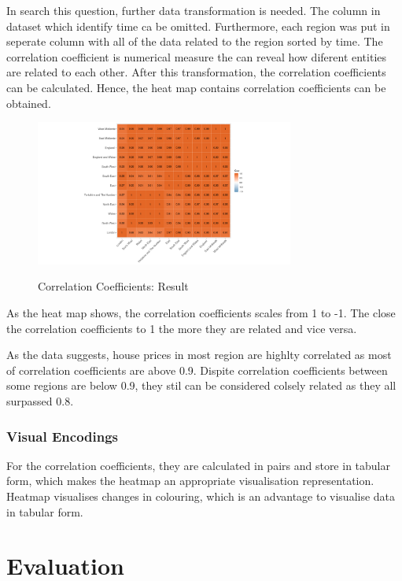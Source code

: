 \documentclass{article}
\begin{document}
In search this question, further data transformation is needed. The column in dataset which identify time 
ca be omitted. Furthermore, each region was put in seperate column with all of the data related to the region 
sorted by time. The correlation coefficient is numerical measure the can reveal how diferent entities are 
related to each other. After this transformation, the correlation coefficients can be calculated. Hence, 
the heat map contains correlation coefficients can be obtained.

\begin{figure}[H]
  \begin{minipage}[b]{1.0\linewidth}
    \centering
    \centerline{\includegraphics[width=8.5cm]{corHeatMap}}
    \centerline{Correlation Coefficients: Result}\medskip
  \end{minipage}
\end{figure}

As the heat map shows, the correlation coefficients scales from 1 to -1. The close the correlation coefficients 
to 1 the more they are related and vice versa.

As the data suggests, house prices in most region are highlty correlated as most of correlation coefficients 
are above 0.9. Dispite correlation coefficients between some regions are below 0.9, they stil can be 
considered colsely related as they all surpassed 0.8.

\subsubsection{Visual Encodings}
For the correlation coefficients, they are calculated in pairs and store in tabular form, which makes the heatmap an appropriate 
visualisation representation. Heatmap visualises changes in colouring, which is an advantage to visualise 
data in tabular form.



\section{Evaluation}
\end{document}
